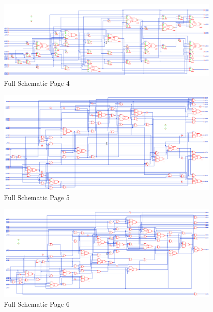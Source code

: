 \documentclass[11pt]{article}
\begin{document}
		
		\begin{figure}[H] 
			\centering 
			\includegraphics[width=\textwidth,height=\dimexpr\textheight-4\baselineskip-\abovecaptionskip-\belowcaptionskip\relax,keepaspectratio]{"Pictures/Full Schematic Page 4"}
			\caption{Full Schematic Page 4} 
			\label{fig:Full-Schematic-Page-4} 
		\end{figure}
		
		
		\begin{figure}[H] 
			\centering 
			\includegraphics[width=\textwidth,height=\dimexpr\textheight-4\baselineskip-\abovecaptionskip-\belowcaptionskip\relax,keepaspectratio]{"Pictures/Full Schematic Page 5"}
			\caption{Full Schematic Page 5} 
			\label{fig:Full-Schematic-Page-5} 
		\end{figure}
		
		
		\begin{figure}[H] 
			\centering 
			\includegraphics[width=\textwidth,height=\dimexpr\textheight-4\baselineskip-\abovecaptionskip-\belowcaptionskip\relax,keepaspectratio]{"Pictures/Full Schematic Page 6"}
			\caption{Full Schematic Page 6} 
			\label{fig:Full-Schematic-Page-6} 
		\end{figure}
		
\end{document}
